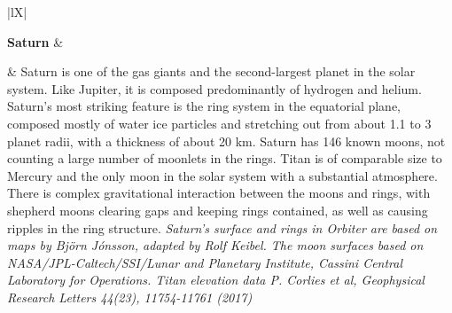\documentclass[Orbiter User Manual.tex]{subfiles}
\begin{document}
\begin{table}[H]
	\begin{tabularx}{\textwidth}{ |lX| }
	\hline\rule{0pt}{2ex}
	\textbf{Saturn} &\\
	\hline\rule{0pt}{2ex}
	& \vfill
	Saturn is one of the gas giants and the second-largest planet in the solar system. Like Jupiter, it is composed predominantly of hydrogen and helium. Saturn's most striking feature is the ring system in the equatorial plane, composed mostly of water ice particles and stretching out from about 1.1 to 3 planet radii, with a thickness of about 20 km.\newline
	Saturn has 146 known moons, not counting a large number of moonlets in the rings. Titan is of comparable size to Mercury and the only moon in the solar system with a substantial atmosphere. There is complex gravitational interaction between the moons and rings, with shepherd moons clearing gaps and keeping rings contained, as well as causing ripples in the ring structure.\newline
	\newline
	\textit{Saturn's surface and rings in Orbiter are based on maps by Björn Jónsson, adapted by Rolf Keibel. The moon surfaces based on NASA/JPL-Caltech/SSI/Lunar and Planetary Institute, Cassini Central Laboratory for Operations. Titan elevation data P. Corlies et al, Geophysical Research Letters 44(23), 11754-11761 (2017)}\\
	\hline
	\end{tabularx}
\end{table}
\end{document}
